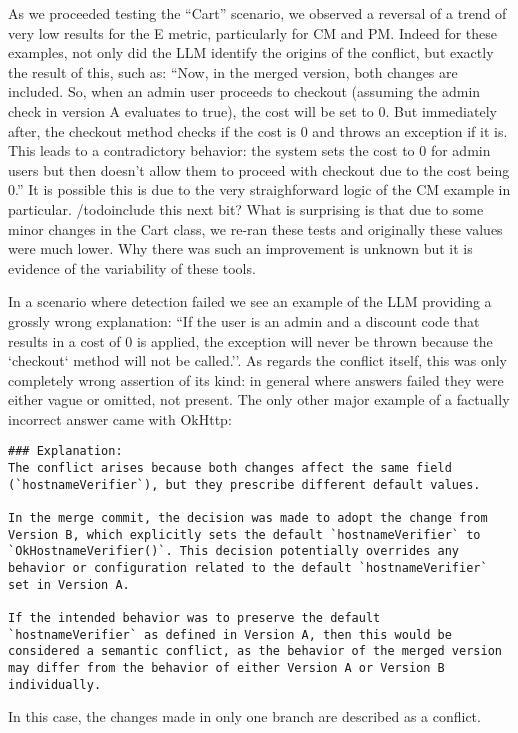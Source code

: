 As we proceeded testing the ``Cart'' scenario, we observed a reversal of a trend of very low results for the E metric, particularly for CM and PM.
Indeed for these examples, not only did the LLM identify the origins of the conflict, but exactly the result of this, such as:
``Now, in the merged version, both changes are included. So, when an admin user proceeds to checkout (assuming the admin check in version A evaluates to true), the cost will be set to 0. But immediately after, the checkout method checks if the cost is 0 and throws an exception if it is. This leads to a contradictory behavior: the system sets the cost to 0 for admin users but then doesn't allow them to proceed with checkout due to the cost being 0.''
It is possible this is due to the very straighforward logic of the CM example in particular. /todo{include this next bit?} What is surprising is that due to some minor changes in the Cart class, we re-ran these tests and originally these values were much lower. Why there was such an improvement is unknown but it is evidence of the variability of these tools.

In a scenario where detection failed we see an example of the LLM providing a grossly wrong explanation: ``If the user is an admin and a discount code that results in a cost of 0 is applied, the exception will never be thrown because the `checkout` method will not be called.''. As regards the conflict itself, this was only completely wrong assertion of its kind: in general where answers failed they were either vague or omitted, not present. The only other major example of a factually incorrect answer came with OkHttp:
\begin{lstlisting}
### Explanation:
The conflict arises because both changes affect the same field (`hostnameVerifier`), but they prescribe different default values.
    
In the merge commit, the decision was made to adopt the change from Version B, which explicitly sets the default `hostnameVerifier` to `OkHostnameVerifier()`. This decision potentially overrides any behavior or configuration related to the default `hostnameVerifier` set in Version A.
    
If the intended behavior was to preserve the default `hostnameVerifier` as defined in Version A, then this would be considered a semantic conflict, as the behavior of the merged version may differ from the behavior of either Version A or Version B individually.
\end{lstlisting}
In this case, the changes made in only one branch are described as a conflict.

